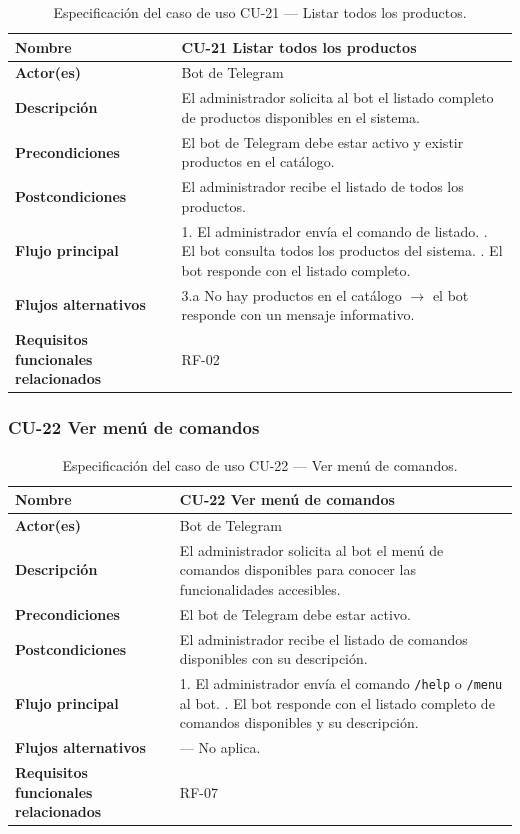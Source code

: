 \begin{table}[H]
\centering
\small
\begin{tabular}{|m{}|m{}|}
\hline
\textbf{Nombre} & CU-21 Listar todos los productos \\ \hline
\textbf{Actor(es)} & Bot de Telegram \\ \hline
\textbf{Descripción} & El administrador solicita al bot el listado completo de productos disponibles en el sistema. \\ \hline
\textbf{Precondiciones} & El bot de Telegram debe estar activo y existir productos en el catálogo. \\ \hline
\textbf{Postcondiciones} & El administrador recibe el listado de todos los productos. \\ \hline
\textbf{Flujo principal} & 1. El administrador envía el comando de listado. \newline 2. El bot consulta todos los productos del sistema. \newline 3. El bot responde con el listado completo. \\ \hline
\textbf{Flujos alternativos} & 3.a No hay productos en el catálogo $\rightarrow$ el bot responde con un mensaje informativo. \\ \hline
\textbf{Requisitos funcionales relacionados} & RF-02 \\ \hline
\end{tabular}
\caption{Especificación del caso de uso CU-21 — Listar todos los productos.}
\end{table}

\subsubsection{CU-22 Ver menú de comandos}

\begin{table}[H]
\centering
\small
\begin{tabular}{|m{}|m{}|}
\hline
\textbf{Nombre} & CU-22 Ver menú de comandos \\ \hline
\textbf{Actor(es)} & Bot de Telegram \\ \hline
\textbf{Descripción} & El administrador solicita al bot el menú de comandos disponibles para conocer las funcionalidades accesibles. \\ \hline
\textbf{Precondiciones} & El bot de Telegram debe estar activo. \\ \hline
\textbf{Postcondiciones} & El administrador recibe el listado de comandos disponibles con su descripción. \\ \hline
\textbf{Flujo principal} & 1. El administrador envía el comando \texttt{/help} o \texttt{/menu} al bot. \newline 2. El bot responde con el listado completo de comandos disponibles y su descripción. \\ \hline
\textbf{Flujos alternativos} & — No aplica. \\ \hline
\textbf{Requisitos funcionales relacionados} & RF-07 \\ \hline
\end{tabular}
\caption{Especificación del caso de uso CU-22 — Ver menú de comandos.}
\end{table}

